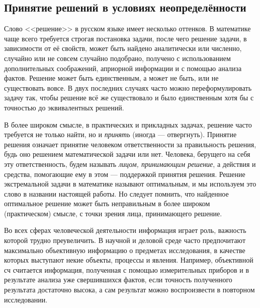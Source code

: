 
\subsection{Принятие решений в условиях неопределённости}
\label{sec:basic_intro}

Слово <<решение>> в русском языке имеет несколько оттенков. В математике чаще всего требуется строгая постановка задачи, после чего решение задачи, в зависимости от её свойств, может быть найдено аналитически или численно, случайно или не совсем случайно подобрано, получено с использованием дополнительных соображений,  априорной информации и с помощью анализа фактов. Решение может быть единственным, а может не быть, или не существовать вовсе. В двух последних случаях часто можно переформулировать задачу так, чтобы решение всё же существовало и было единственным хотя бы с точностью до эквивалентных решений. 

В более широком смысле, в практических и прикладных задачах, решение часто требуется не только найти, но и {\sl принять} (иногда --- отвергнуть). Принятие решения означает принятие человеком ответственности за правильность решения, будь оно решением математической задачи или нет. Человека, берущего на себя эту ответственность, будем называть {\sl лицом, принимающим решение}, а действия и средства, помогающие ему в этом ---  поддержкой принятия решения. Решение экстремальной задачи в математике называют оптимальным, и мы используем это слово в названии настоящей работы. Но следует помнить, что найденное оптимальное решение может быть неправильным в более широком (практическом) смысле, с точки зрения лица, принимающего решение. 

Во всех сферах человеческой деятельности информация играет роль, важность которой трудно преувеличить. В научной и деловой среде часто предпочитают максимально объективную информацию о предметах исследования, в качестве которых выступают некие объекты, процессы и явления. Например, объективной сч считается информация, полученная с помощью измерительных приборов и в результате анализа уже свершившихся фактов, если точность полученного результата достаточно высока, а сам результат можно воспроизвести в повторном исследовании. 

